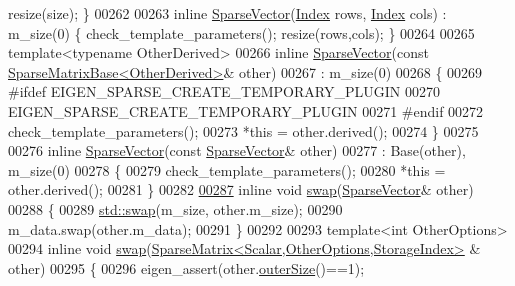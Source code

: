 \begin{DoxyCode}
      resize(size); \}
00262 
00263     \textcolor{keyword}{inline} \hyperlink{group___sparse_core___module_class_eigen_1_1_sparse_vector}{SparseVector}(\hyperlink{group___core___module_a554f30542cc2316add4b1ea0a492ff02}{Index} rows, \hyperlink{group___core___module_a554f30542cc2316add4b1ea0a492ff02}{Index} cols) : m\_size(0) \{ 
      check\_template\_parameters(); resize(rows,cols); \}
00264 
00265     \textcolor{keyword}{template}<\textcolor{keyword}{typename} OtherDerived>
00266     \textcolor{keyword}{inline} \hyperlink{group___sparse_core___module_class_eigen_1_1_sparse_vector}{SparseVector}(\textcolor{keyword}{const} \hyperlink{group___sparse_core___module_class_eigen_1_1_sparse_matrix_base}{SparseMatrixBase<OtherDerived>}& 
      other)
00267       : m\_size(0)
00268     \{
00269 \textcolor{preprocessor}{      #ifdef EIGEN\_SPARSE\_CREATE\_TEMPORARY\_PLUGIN}
00270         EIGEN\_SPARSE\_CREATE\_TEMPORARY\_PLUGIN
00271 \textcolor{preprocessor}{      #endif}
00272       check\_template\_parameters();
00273       *\textcolor{keyword}{this} = other.derived();
00274     \}
00275 
00276     \textcolor{keyword}{inline} \hyperlink{group___sparse_core___module_class_eigen_1_1_sparse_vector}{SparseVector}(\textcolor{keyword}{const} \hyperlink{group___sparse_core___module_class_eigen_1_1_sparse_vector}{SparseVector}& other)
00277       : Base(other), m\_size(0)
00278     \{
00279       check\_template\_parameters();
00280       *\textcolor{keyword}{this} = other.derived();
00281     \}
00282 
\hyperlink{group___sparse_core___module_a977f1796d4b332a0827c5a1d7b1ed561}{00287}     \textcolor{keyword}{inline} \textcolor{keywordtype}{void} \hyperlink{group___sparse_core___module_a977f1796d4b332a0827c5a1d7b1ed561}{swap}(\hyperlink{group___sparse_core___module_class_eigen_1_1_sparse_vector}{SparseVector}& other)
00288     \{
00289       \hyperlink{endian_8c_a3ca5ecd34b04d6a243c054ac3a57f68d}{std::swap}(m\_size, other.m\_size);
00290       m\_data.swap(other.m\_data);
00291     \}
00292 
00293     \textcolor{keyword}{template}<\textcolor{keywordtype}{int} OtherOptions>
00294     \textcolor{keyword}{inline} \textcolor{keywordtype}{void} \hyperlink{endian_8c_a3ca5ecd34b04d6a243c054ac3a57f68d}{swap}(\hyperlink{group___sparse_core___module_class_eigen_1_1_sparse_matrix}{SparseMatrix<Scalar,OtherOptions,StorageIndex>}
      & other)
00295     \{
00296       eigen\_assert(other.\hyperlink{group___sparse_core___module_a4e5f706cfae14d2eaec1ea1e234905f1}{outerSize}()==1);

\end{DoxyCode}
